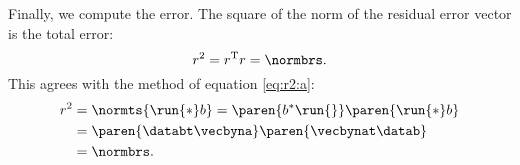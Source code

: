 Finally, we compute the error. The square of the norm of the residual error vector is the total error:
\begin{equation}
  r^{2} = r^{\mathrm{T}}r = \normbrs.
\end{equation}
This agrees with the method of equation \eqref{eq:r2:a}:
\begin{equation}
\begin{split}
      r^{2} 
       &= \normts{ \run{*} b  } = \paren{ b^{*} \run{} } \paren{ \run{*}  b} \\
       &= \paren{\databt \vecbyna}  \paren{\vecbynat \datab}  \\
       &= \normbrs.
 \end{split}
\end{equation}



\endinput